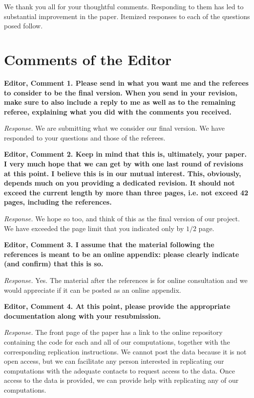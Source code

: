 \restoregeometry
\doublespacing

\noindent We thank you all for your thoughtful comments. Responding to them has led to substantial improvement in the paper. Itemized responses to each of the questions posed follow.

\section*{Comments of the Editor}

\noindent \textbf{Editor, Comment 1. Please send in what you want me and the referees to consider to be the final version. When you send in your revision, make sure to also include a reply to me as well as to the remaining referee, explaining what you did with the comments you received.}

\noindent \textit{Response.} We are submitting what we consider our final version. We have responded to your questions and those of the referees.

\noindent \textbf{Editor, Comment 2. Keep in mind that this is, ultimately, your paper. I very much hope that we can get by with one last round of revisions at this point. I believe this is in our mutual interest. This, obviously, depends much on you providing a dedicated revision. It should not exceed the current length by more than three pages, i.e. not exceed 42 pages, including the references.}

\noindent \textit{Response.} We hope so too, and think of this as the final version of our project. We have exceeded the page limit that you indicated only by $1/2$ page.

\noindent \textbf{Editor, Comment 3. I assume that the material following the references is meant to be an online appendix: please clearly indicate (and confirm) that this is so.}

\noindent \textit{Response.} Yes. The material after the references is for online consultation and we would appreciate if it can be posted as an online appendix.

\noindent \textbf{Editor, Comment 4. At this point, please provide the appropriate documentation along with your resubmission.}

\noindent \textit{Response.} The front page of the paper has a link to the online repository containing the code for each and all of our computations, together with the corresponding replication instructions. We cannot post the data because it is not open access, but we can facilitate any person interested in replicating our computations with the adequate contacts to request access to the data. Once access to the data is provided, we can provide help with replicating any of our computations.

